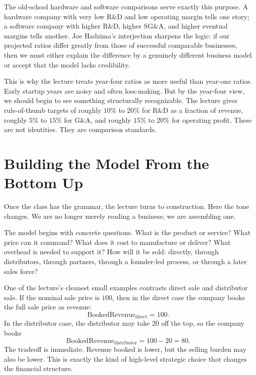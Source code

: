 The old-school hardware and software comparisons serve exactly this purpose. A hardware company with very low R\&D and low operating margin tells one story; a software company with higher R\&D, higher SG\&A, and higher eventual margins tells another. Joe Hadzima's interjection sharpens the logic: if our projected ratios differ greatly from those of successful comparable businesses, then we must either explain the difference by a genuinely different business model or accept that the model lacks credibility.

This is why the lecture treats year-four ratios as more useful than year-one ratios. Early startup years are noisy and often loss-making. But by the year-four view, we should begin to see something structurally recognizable. The lecture gives rule-of-thumb targets of roughly \(10\%\) to \(20\%\) for R\&D as a fraction of revenue, roughly \(5\%\) to \(15\%\) for G\&A, and roughly \(15\%\) to \(20\%\) for operating profit. These are not identities. They are comparison standards.

\section{Building the Model From the Bottom Up}

Once the class has the grammar, the lecture turns to construction. Here the tone changes. We are no longer merely reading a business; we are assembling one.

The model begins with concrete questions. What is the product or service? What price can it command? What does it cost to manufacture or deliver? What overhead is needed to support it? How will it be sold: directly, through distributors, through partners, through a founder-led process, or through a later sales force?

One of the lecture's cleanest small examples contrasts direct sale and distributor sale. If the nominal sale price is \(100\), then in the direct case the company books the full sale price as revenue:
\begin{equation}
\mathrm{BookedRevenue}_{\mathrm{direct}} = 100.
\end{equation}
In the distributor case, the distributor may take \(20\) off the top, so the company books
\begin{equation}
\mathrm{BookedRevenue}_{\mathrm{distributor}} = 100 - 20 = 80.
\end{equation}
The tradeoff is immediate. Revenue booked is lower, but the selling burden may also be lower. This is exactly the kind of high-level strategic choice that changes the financial structure.

